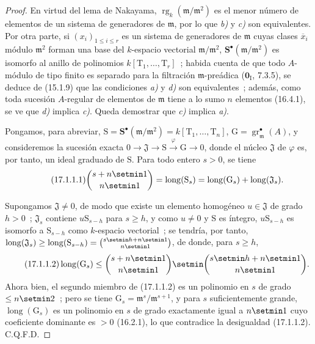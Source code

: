 \begin{proof}
En virtud del lema de Nakayama,
$\operatorname{rg}_k(\mathfrak{m}/\mathfrak{m}^2)$ es el menor número de
elementos de un sistema de generadores de $\mathfrak{m}$, por lo que \emph{b)} y \emph{c)} son
equivalentes. Por otra parte, si $(x_i)_{1\leq i\leq r}$ es un sistema de
generadores de $\mathfrak{m}$ cuyas clases $\overline{x}_i$ módulo
$\mathfrak{m}^2$ forman una base del $k$-espacio vectorial
$\mathfrak{m}/\mathfrak{m}^2$, $\mathbf{S}^\bullet(\mathfrak{m}/\mathfrak{m}^2)$
es isomorfo al anillo de
polinomios $k[\mathrm{T}_1,\ldots,\mathrm{T}_r]$~; habida cuenta de que todo
$A$-módulo de tipo finito es separado para la filtración $\mathfrak{m}$-preádica
($\mathbf{0}_{\mathrm I}$, 7.3.5), se deduce de (15.1.9) que las condiciones \emph{a)} y \emph{d)}
son equivalentes~; además, como toda sucesión $A$-regular de elementos de
$\mathfrak{m}$ tiene a lo sumo $n$ elementos (16.4.1), se ve que \emph{d)} implica \emph{c)}.
Queda demostrar que \emph{c)} implica \emph{a)}.

Pongamos, para abreviar,
$\mathrm{S}=\mathbf{S}^\bullet(\mathfrak{m}/\mathfrak{m}^2)
=k[\mathrm{T}_1,\ldots,\mathrm{T}_n]$,
$\mathrm{G}=\operatorname{gr}^\bullet_{\mathfrak{m}}(A)$, y consideremos la sucesión
exacta
$0\longrightarrow\mathfrak{J}\longrightarrow\mathrm{S}
\xrightarrow{\varphi}\mathrm{G}\longrightarrow0$, donde el núcleo
$\mathfrak{J}$ de $\varphi$ es, por tanto, un ideal graduado de $\mathrm{S}$. Para
todo entero $s>0$, se tiene
\begin{equation}
\label{0.17.1.1.1-fr}
\tag{17.1.1.1}
  \binom{s+n\setmin 1}{n\setmin 1}
  =\operatorname{long}(\mathrm{S}_s)
  =\operatorname{long}(\mathrm{G}_s)
  +\operatorname{long}(\mathfrak{J}_s).
\end{equation}

Supongamos $\mathfrak{J}\neq0$, de modo que existe un elemento homogéneo
$u\in\mathfrak{J}$ de grado $h>0$~; $\mathfrak{J}_s$ contiene
$u\mathrm{S}_{s-h}$ para $s\geq h$, y como $u\neq0$ y $\mathrm{S}$ es
íntegro, $u\mathrm{S}_{s-h}$ es isomorfo a $\mathrm{S}_{s-h}$ como
$k$-espacio vectorial~; se tendría, por tanto,
$\operatorname{long}(\mathfrak{J}_s)\geq
\operatorname{long}(\mathrm{S}_{s-h})=\binom{s\setmin h+n\setmin 1}{n\setmin 1}$, de donde, para
$s\geq h$,
\begin{equation}
\label{0.17.1.1.2-fr}
\tag{17.1.1.2}
  \operatorname{long}(\mathrm{G}_s)
  \leq\binom{s+n\setmin 1}{n\setmin 1}\setmin\binom{s\setmin h+n\setmin 1}{n\setmin 1}.
\end{equation}
Ahora bien, el segundo miembro de (17.1.1.2) es un polinomio en $s$ de grado
$\leq n\setmin 2$~; pero se tiene
$\mathrm{G}_s=\mathfrak{m}^s/\mathfrak{m}^{s+1}$, y para $s$ suficientemente grande,
$\operatorname{long}(\mathrm{G}_s)$ es un polinomio en $s$ de grado exactamente
igual a $n\setmin 1$ cuyo coeficiente dominante es $>0$ (16.2.1), lo que contradice
la desigualdad (17.1.1.2). C.Q.F.D.
\end{proof}

